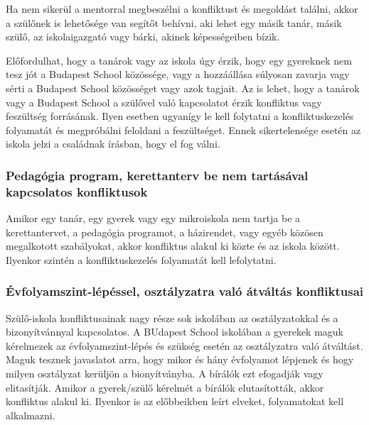 Ha nem sikerül a mentorral megbeszélni a konfliktust és megoldást találni, akkor a szülőnek is lehetősége van segítőt behívni, aki lehet egy másik tanár, másik szülő, az iskolaigazgató vagy bárki, akinek képességeiben bízik.

Előfordulhat, hogy a tanárok vagy az iskola úgy érzik, hogy egy gyereknek nem tesz jót a Budapest School közössége, vagy a hozzáállása súlyosan zavarja vagy sérti a Budapest School közösséget vagy azok tagjait. Az is lehet, hogy a tanárok vagy a Budapest School a szülővel való kapcsolatot érzik konfliktus vagy feszültség forrásának. Ilyen esetben ugyanígy le kell folytatni a konfliktuskezelés folyamatát és megpróbálni feloldani a feszültséget. Ennek sikertelensége esetén az iskola jelzi a családnak írásban, hogy el fog válni.

\subsubsection{Pedagógia program, kerettanterv be nem tartásával kapcsolatos konfliktusok}

Amikor egy tanár, egy gyerek vagy egy mikroiskola nem tartja be a kerettantervet, a pedagógia programot, a házirendet, vagy egyéb közösen megalkotott szabályokat, akkor konfliktus alakul ki közte és az iskola között. Ilyenkor szintén a konfliktuskezelés folyamatát kell lefolytatni.

\subsubsection{Évfolyamszint-lépéssel, osztályzatra való átváltás konfliktusai}
Szülő-iskola konfliktusainak nagy része sok iskolában az osztályzatokkal és a bizonyítvánnyal kapcsolatos. A BUdapest School iskolában a gyerekek maguk kérelmezek az évfolyamszint-lépés és szükség esetén az osztályzatra való átváltást. Maguk tesznek javaslatot arra, hogy mikor és hány évfolyamot lépjenek és hogy milyen osztályzat kerüljön a bionyítványba. A bírálók ezt efogadják vagy elitasítják. Amikor a gyerek/szülő kérelmét a bírálók elutasították, akkor konfliktus alakul ki. Ilyenkor is az előbbeikben leírt elveket, folyamatokat kell alkalmazni.